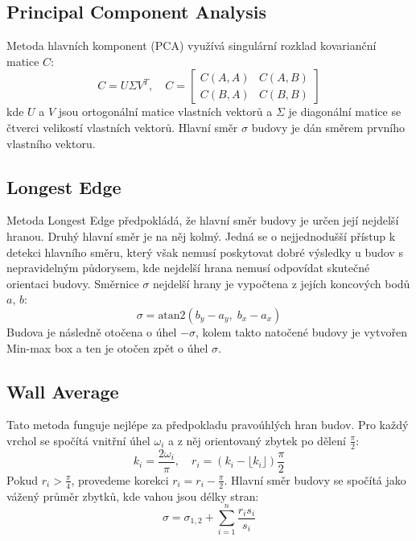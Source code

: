 \documentclass[11pt, a4paper]{article}
\begin{document}
\subsection{Principal Component Analysis}
Metoda hlavních komponent (PCA) využívá singulární rozklad kovarianční matice $C$:
\begin{equation}
C = U\Sigma V^T, \quad C = \begin{bmatrix} C(A,A) & C(A,B) \\ C(B,A) & C(B,B) \end{bmatrix}
\end{equation}
kde $U$ a $V$ jsou ortogonální matice vlastních vektorů a $\Sigma$ je diagonální matice se čtverci velikostí vlastních vektorů. Hlavní směr $\sigma$ budovy je dán směrem prvního vlastního vektoru.

\subsection{Longest Edge}
Metoda Longest Edge předpokládá, že hlavní směr budovy je určen její nejdelší hranou. Druhý hlavní směr je na něj kolmý. Jedná se o nejjednodušší přístup k detekci hlavního směru, který však nemusí poskytovat dobré výsledky u budov s nepravidelným půdorysem, kde nejdelší hrana nemusí odpovídat skutečné orientaci budovy. Směrnice $\sigma$ nejdelší hrany je vypočtena z jejích koncových bodů $a$, $b$:
\begin{equation}
\sigma = \text{atan2}(b_y - a_y,\; b_x - a_x)
\end{equation}
Budova je následně otočena o úhel $-\sigma$, kolem takto natočené budovy je vytvořen Min-max box a ten je otočen zpět o úhel $\sigma$.

\subsection{Wall Average}
Tato metoda funguje nejlépe za předpokladu pravoúhlých hran budov. Pro každý vrchol se spočítá vnitřní úhel $\omega_i$ a z něj orientovaný zbytek po dělení $\frac{\pi}{2}$:
\begin{equation}
k_i = \frac{2\omega_i}{\pi}, \quad r_i = (k_i - \lfloor k_i \rfloor)\frac{\pi}{2}
\end{equation}
Pokud $r_i > \frac{\pi}{4}$, provedeme korekci $r_i = r_i - \frac{\pi}{2}$. Hlavní směr budovy se spočítá jako vážený průměr zbytků, kde vahou jsou délky stran:
\begin{equation}
\sigma = \sigma_{1,2} + \sum_{i=1}^{n} \frac{r_i s_i}{s_i}
\end{equation}
\end{document}
